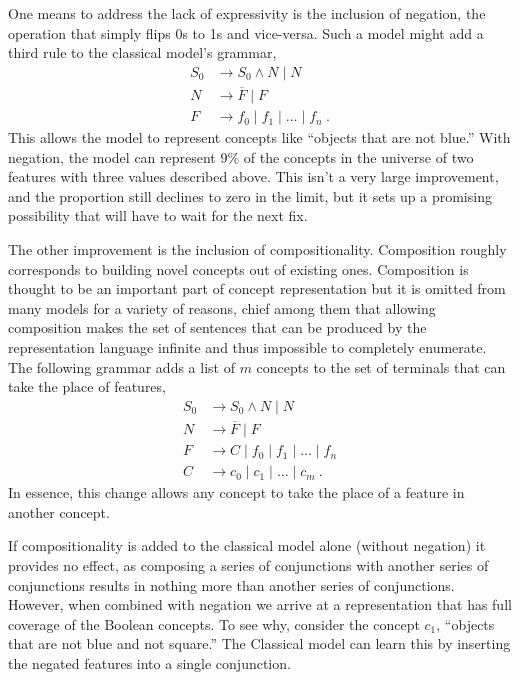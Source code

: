 \documentclass[doc,floatsintext]{apa6}
\begin{document}

One means to address the lack of expressivity is the inclusion of negation, the operation that simply flips 0s to 1s and vice-versa. Such a model might add a third rule to the classical model's grammar,
\begin{align} \label{eqn:classical_neg}
  S_0 &\rightarrow S_0 \wedge N \mid N \\
  N &\rightarrow \overline{F} \mid F \nonumber \\
  F &\rightarrow f_0 \mid f_1 \mid \dots \mid f_n ~. \nonumber
\end{align}
This allows the model to represent concepts like ``objects that are not blue.'' With negation, the model can represent $9\%$ of the concepts in the universe of two features with three values described above. This isn't a very large improvement, and the proportion still declines to zero in the limit, but it sets up a promising possibility that will have to wait for the next fix.

The other improvement is the inclusion of compositionality. Composition roughly corresponds to building novel concepts out of existing ones. Composition is thought to be an important part of concept representation \citep{goodmantfg2008} but it is omitted from many models for a variety of reasons, chief among them that allowing composition makes the set of sentences that can be produced by the representation language infinite and thus impossible to completely enumerate. The following grammar adds a list of $m$ concepts to the set of terminals that can take the place of features,
\begin{align} \label{eqn:classical_neg_comp}
  S_0 &\rightarrow S_0 \wedge N \mid N \\
  N &\rightarrow \overline{F} \mid F \nonumber \\
  F &\rightarrow C \mid f_0 \mid f_1 \mid \dots \mid f_n \nonumber \\
  C &\rightarrow c_0 \mid c_1 \mid \dots \mid c_m ~. \nonumber
\end{align}
In essence, this change allows any concept to take the place of a feature in another concept.

If compositionality is added to the classical model alone (without negation) it provides no effect, as composing a series of conjunctions with another series of conjunctions results in nothing more than another series of conjunctions. However, when combined with negation we arrive at a representation that has full coverage of the Boolean concepts. To see why, consider the concept $c_1$, ``objects that are not blue and not square.'' The Classical model can learn this by inserting the negated features into a single conjunction.
\end{document}
